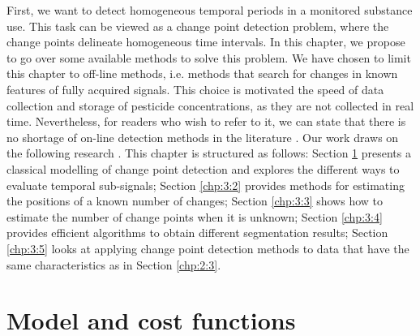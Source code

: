 First, we want to detect homogeneous temporal periods in a monitored substance use. This task can be viewed as a change point detection problem, where the change points delineate homogeneous time intervals. In this chapter, we propose to go over some available methods to solve this problem.  
We have chosen to limit this chapter to off-line methods, i.e. methods that search for changes in known features of fully acquired signals. This choice is motivated the speed of data collection and storage of pesticide concentrations, as they are not collected in real time. Nevertheless, for readers who wish to refer to it, we can state that there is no shortage of on-line detection methods in the literature \citep{liu2017change,Li2021,hohle2010online,ranganathan2010pliss,li2015m}.
Our work draws on the following research \citep{truong2020,basseville1993detection,bardet2020}. This chapter is structured as follows: Section \ref{chp:3:1} presents a classical modelling of change point detection and explores the different ways to evaluate temporal sub-signals; Section \ref{chp:3:2} provides methods for estimating the positions of a known number of changes; Section \ref{chp:3:3} shows how to estimate the number of change points when it is unknown; Section \ref{chp:3:4} provides efficient algorithms to obtain different segmentation results; Section \ref{chp:3:5} looks at applying change point detection methods to data that have the same characteristics as in Section \ref{chp:2:3}.

\section{Model and cost functions}\label{chp:3:1}

